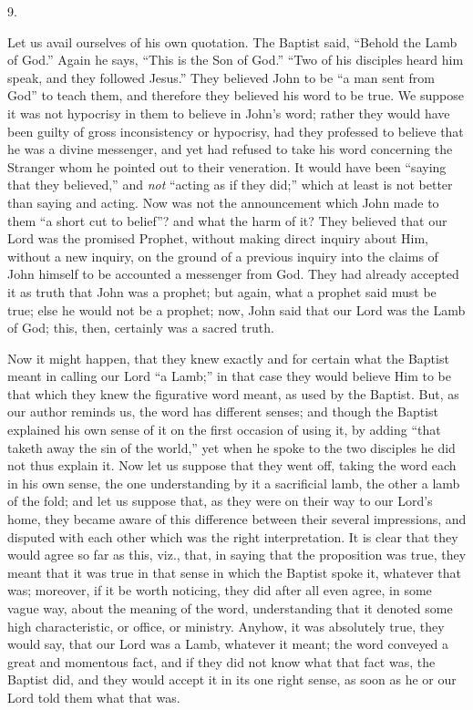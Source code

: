 9.

Let us avail ourselves of his own quotation. The
Baptist said, ``Behold the Lamb of God.'' Again he says, ``This is the
Son of God.'' ``Two of his disciples heard him speak, and they followed
Jesus.'' They believed John to be ``a man sent from God'' to teach them,
and therefore they believed his word to be true. We suppose it
was not hypocrisy in them to believe in John's word; rather they would
have been guilty of gross inconsistency or hypocrisy, had they
professed to believe that he was a divine messenger, and yet had
refused to take his word concerning the Stranger whom he pointed out
to their veneration. It would have been ``saying that they believed,''
and \emph{not} ``acting as if they did;'' which at least is not better
than saying and acting. Now was not the announcement which John made
to them ``a short cut to belief''? and what the harm of it? They
believed that our Lord was the promised Prophet, without making direct
inquiry about Him, without a new inquiry, on the ground of a previous
inquiry into the claims of John himself to be accounted a messenger
from God. They had already accepted it as truth that John was a
prophet; but again, what a prophet said must be true; else he would
not be a prophet; now, John said that our Lord was the Lamb of God;
this, then, certainly was a sacred truth.

Now it might happen, that they knew exactly and
for certain what the Baptist meant in calling our Lord ``a Lamb;'' in
that case they would believe Him to be that which they knew the
figurative word meant, as used by the Baptist. But, as our author
reminds us, the word has different senses; and though the Baptist
explained his own sense of it on the first occasion of using it, by
adding ``that taketh away the sin of the world,'' yet when he spoke to
the two disciples he did not thus explain it. Now let us suppose that
they went off, taking the word each in his own sense, the one
understanding by it a sacrificial lamb, the other a lamb of the fold;
and let us suppose that, as they were on their way to our Lord's home,
they became aware of this difference between their several
impressions, and disputed with each other which was the right
interpretation. It is clear that they would agree so far as this,
viz., that, in saying that the proposition was true, they meant that
it was true in that sense in which the Baptist spoke it, whatever that
was; moreover, if it be worth noticing, they did after all even agree,
in some vague way, about the meaning of the word, understanding that
it denoted some high characteristic, or office, or ministry. Anyhow,
it was absolutely true, they would say, that our Lord was a Lamb,
whatever it meant; the word conveyed a great and momentous fact, and
if they did not know what that fact was, the Baptist did, and they
would accept it in its one right sense, as soon as he or our Lord told
them what that was.


